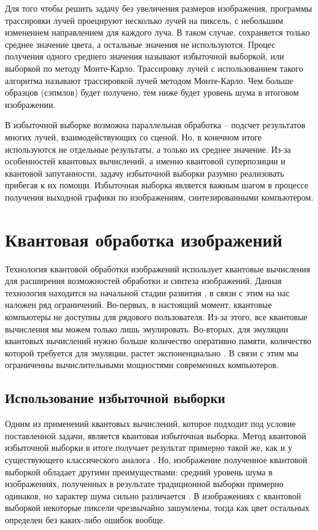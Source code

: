 Для того чтобы решить задачу без увеличения размеров изображения, программы трассировки лучей проецируют несколько лучей на пиксель, с небольшим изменением направлением для каждого луча. В таком случае, сохраняется только среднее значение цвета, а остальные значения не используются. Процес получения одного среднего значения называют избыточной выборкой, или выборкой по методу Монте-Карло. Трассировку лучей с использованием такого алгоритма называют трассировкой лучей методом Монте-Карло. Чем больше образцов (сэпмлов) будет получено, тем ниже будет уровень шума в итоговом изображении. 

В избыточной выборке возможна параллельная обработка -- подсчет результатов многих лучей, взаимодействующих со сценой. Но, в конечном итоге используются не отдельные результаты, а только их среднее значение. Из-за особенностей квантовых вычислений, а именно квантовой суперпозиции и квантовой запутанности, задачу избыточной выборки разумно реализовать прибегая к их помощи. Избыточная выборка является важным шагом в процессе получения выходной графики по изображениям, синтезированными компьютером.

\section{Квантовая обработка изображений}

Технология квантовой обработки изображений использует квантовые вычисления для расширения возможностей обработки и синтеза изображений. Данная технология находится на начальной стадии развития \cite{state}, в связи с этим на нас наложен ряд ограничений. Во-первых, в настоящий момент, квантовые компьютеры не доступны для рядового пользователя. Из-за этого, все квантовые вычисления мы можем только лишь эмулировать. Во-вторых, для эмуляции квантовых вычислений нужно больше количество оперативно памяти, количество которой требуется для эмуляции, растет экспоненциально \cite{emulating}. В связи с этим мы ограниченны вычислительными мощностями современных компьютеров.

\subsection{Использование избыточной выборки}

 Одним из применений квантовых вычислений, которое подходит под условие поставленной задачи, является квантовая избыточная выборка.
 Метод квантовой избыточной выборки в итоге получает результат примерно такой же, как и у существующего классического аналога \cite{PQC}. Но, изображение полученное квантовой выборкой обладает другими преимуществами: средний уровень шума в изображениях, полученных в результате традиционной выборки примерно одинаков, но характер шума сильно различается \cite{PQC}. В изображениях с квантовой выборкой некоторые пиксели чрезвычайно зашумлены, тогда как цвет остальных определен без каких-либо ошибок вообще.
 
